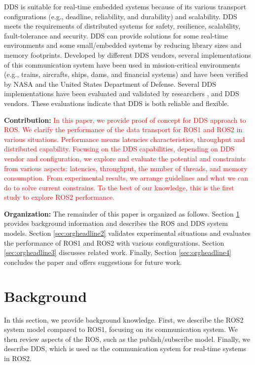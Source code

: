 \documentclass{sig-alternate-05-2015}
\begin{document}
DDS is suitable for real-time embedded systems because of its various transport configurations (e.g., deadline, reliability, and durability) and scalability.
DDS meets the requirements of distributed systems for safety, resilience, scalability, fault-tolerance and security.
DDS can provide solutions for some real-time environments and some small/embedded systems by reducing library sizes and memory footprints.
Developed by different DDS vendors, several implementations of this communication system have been used in mission-critical environments (e.g., trains, aircrafts, ships, dams, and financial systems) and have been verified by NASA and the United States Department of Defense. 
Several DDS implementations have been evaluated and validated by researchers \cite{xiong2010evaluating}, \cite{sierla2003evaluation} and DDS vendors.
These evaluations indicate that DDS is both reliable and flexible.

\textbf{Contribution:}
\textcolor{red}{In this paper, we provide proof of concept for DDS approach to ROS.
We clarify the performance of the data transport for ROS1 and ROS2 in various situations.
Performance means latencies characteristics, throughput and distributed capability.
Focusing on the DDS capabilities, depending on DDS vendor and configuration, we explore and evaluate the potential and constraints from various aspects: latencies, throughput, the number of threads, and memory consumption.
From experimental results, we arrange guidelines and what we can do to solve current constrains.
To the best of our knowledge, this is the first study to explore ROS2 performance.}

\textbf{Organization:} 
The remainder of this paper is organized as follows. 
Section \ref{sec:orgheadline1} provides background information and describes the ROS and DDS system models. 
Section \ref{sec:orgheadline2} validates experimental situations and evaluates the performance of ROS1 and ROS2 with various configurations. 
Section \ref{sec:orgheadline3} discusses related work. 
Finally, Section \ref{sec:orgheadline4} concludes the paper and offers suggestions for future work.

\vspace{-3mm}
\section{Background}
\label{sec:orgheadline1}

In this section, we provide background knowledge. 
First, we describe the ROS2 system model compared to ROS1, focusing on its communication system. 
We then review aspects of the ROS, such as the publish/subscribe model. 
Finally, we describe DDS, which is used as the communication system for real-time systems in ROS2. 
\end{document}
